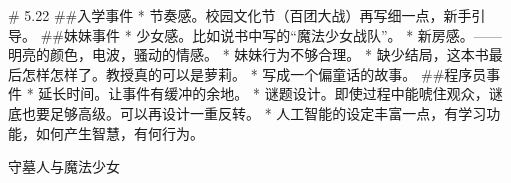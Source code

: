 
# 5.22
##入学事件
* 节奏感。校园文化节（百团大战）再写细一点，新手引导。
##妹妹事件
* 少女感。比如说书中写的“魔法少女战队”。
* 新房感。——明亮的颜色，电波，骚动的情感。
* 妹妹行为不够合理。
* 缺少结局，这本书最后怎样怎样了。教授真的可以是萝莉。
* 写成一个偏童话的故事。
##程序员事件
* 延长时间。让事件有缓冲的余地。
* 谜题设计。即使过程中能唬住观众，谜底也要足够高级。可以再设计一重反转。
* 人工智能的设定丰富一点，有学习功能，如何产生智慧，有何行为。

守墓人与魔法少女
